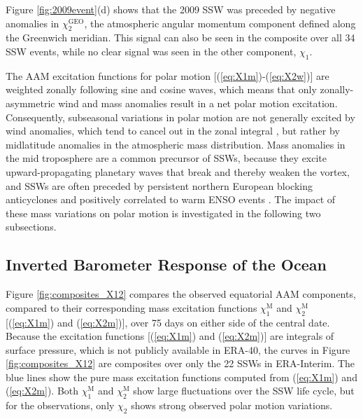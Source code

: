 \documentclass[draft,jgrga]{agutex}
\begin{document}
\begin{article}
Figure \ref{fig:2009event}(d) shows that the 2009 SSW was preceded by  {negative anomalies} in $\chi_2^{\text{GEO}}$,  {the atmospheric angular momentum component defined along the Greenwich meridian}.
This signal  can also be  seen in the composite over all 34 SSW events, while no clear signal was seen in the other component, $\chi_1$.

The AAM excitation functions for polar motion  [(\ref{eq:X1m})-(\ref{eq:X2w})] are weighted zonally following sine and cosine waves, which  means that only zonally-asymmetric wind and mass anomalies result in a net polar motion excitation.
Consequently,  subseasonal variations in polar motion are not generally excited by wind anomalies, which tend to cancel out in the zonal integral \citep{barnesetal1983,Eubanks1988}, but rather by  midlatitude anomalies in the atmospheric mass distribution. 
Mass anomalies in the mid troposphere are a common precursor of SSWs, because they excite upward-propagating planetary waves that break and thereby weaken the vortex, and
SSWs are often preceded by persistent northern European blocking anticyclones \citep{quiroz1986, martiusetal2009, woollingsetal2010} and positively correlated to warm ENSO events \citep{Garfinkel2008}.
The impact of these mass variations on polar motion is investigated in the following two subsections.  

\subsection{ {Inverted Barometer Response of the Ocean}}
\label{sec:IB}
Figure \ref{fig:composites_X12} compares the observed  {equatorial AAM components,  compared to their corresponding mass excitation functions}  $\chi_1^{\text{M}}$ and $\chi_2^{\text{M}}$ [(\ref{eq:X1m}) and (\ref{eq:X2m})], over 75 days on either side of the central date.
Because the excitation functions [(\ref{eq:X1m}) and (\ref{eq:X2m})] are integrals of surface pressure, which is not publicly available in ERA-40, the curves in Figure \ref{fig:composites_X12} are composites over only the 22 SSWs in  ERA-Interim.
The  {blue} lines show the pure mass excitation functions computed from (\ref{eq:X1m}) and (\ref{eq:X2m}).
Both $\chi_1^{\text{M}}$ and $\chi_2^{\text{M}}$ show large fluctuations over the SSW life cycle,  {but for the observations, only} $\chi_2$ shows strong observed polar motion variations. 


\end{article}
\end{document}
